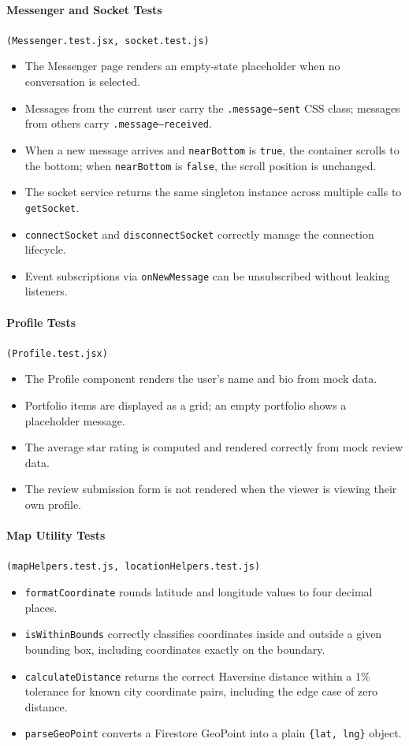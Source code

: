 \documentclass[11pt]{article}
\begin{document}
\paragraph{Messenger and Socket Tests} \texttt{(Messenger.test.jsx, socket.test.js)}
\begin{itemize}[leftmargin=1.4em]
  \item The Messenger page renders an empty-state placeholder when no conversation is selected.
  \item Messages from the current user carry the \texttt{.message--sent} CSS class; messages from others carry \texttt{.message--received}.
  \item When a new message arrives and \texttt{nearBottom} is \texttt{true}, the container scrolls to the bottom; when \texttt{nearBottom} is \texttt{false}, the scroll position is unchanged.
  \item The socket service returns the same singleton instance across multiple calls to \texttt{getSocket}.
  \item \texttt{connectSocket} and \texttt{disconnectSocket} correctly manage the connection lifecycle.
  \item Event subscriptions via \texttt{onNewMessage} can be unsubscribed without leaking listeners.
\end{itemize}

\paragraph{Profile Tests} \texttt{(Profile.test.jsx)}
\begin{itemize}[leftmargin=1.4em]
  \item The Profile component renders the user's name and bio from mock data.
  \item Portfolio items are displayed as a grid; an empty portfolio shows a placeholder message.
  \item The average star rating is computed and rendered correctly from mock review data.
  \item The review submission form is not rendered when the viewer is viewing their own profile.
\end{itemize}

\paragraph{Map Utility Tests} \texttt{(mapHelpers.test.js, locationHelpers.test.js)}
\begin{itemize}[leftmargin=1.4em]
  \item \texttt{formatCoordinate} rounds latitude and longitude values to four decimal places.
  \item \texttt{isWithinBounds} correctly classifies coordinates inside and outside a given bounding box, including coordinates exactly on the boundary.
  \item \texttt{calculateDistance} returns the correct Haversine distance within a 1\% tolerance for known city coordinate pairs, including the edge case of zero distance.
  \item \texttt{parseGeoPoint} converts a Firestore GeoPoint into a plain \texttt{\{lat, lng\}} object.
\end{itemize}
\end{document}

